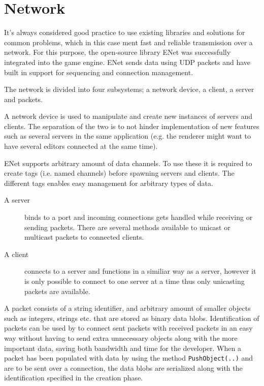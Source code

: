 \section{Network}
It's always considered good practice to use existing libraries and solutions for common problems, which in this case ment fast and reliable transmission over a network.
For this purpose, the open-source library ENet was successfully integrated into the game engine. ENet sends data using UDP packets and have built in support for sequencing and connection management. 

The network is divided into four subsystems; a network device, a client, a server and packets.

A network device is used to manipulate and create new instances of servers and clients. The separation of the two is to not hinder implementation of new features such as several servers in the same application (e.g. the renderer might want to have several editors connected at the same time).

ENet supports arbitrary amount of data channels. To use these it is required to create tags (i.e. named channels) before spawning servers and clients. The different tags enables easy management for arbitrary types of data.

\begin{description}
	\item[A server] binds to a port and incoming connections gets handled while \mbox{receiving} or sending packets. There are several methods available to unicast or multicast packets to connected clients.
	\item[A client] connects to a server and functions in a similiar way as a server, however it is only possible to connect to one server at a time thus only unicasting packets are available.
\end{description}

A packet consists of a string identifier, and arbitrary amount of smaller \mbox{objects} such as integers, strings etc. that are stored as binary data blobs.
Identification of packets can be used by to connect sent packets with received packets in an easy way without having to send extra unnecessary objects along with the more important data, saving both bandwidth and time for the developer.
When a packet has been populated with data by using the method \texttt{PushObject(..)} and are to be sent over a connection, the data blobs are serialized along with the identification specified in the creation phase.


